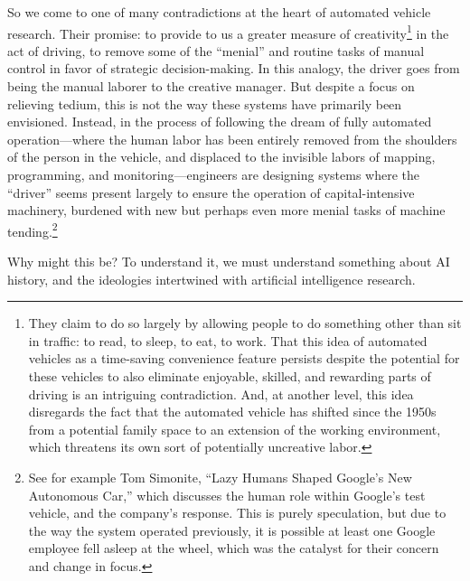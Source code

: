 So we come to one of many contradictions at the heart of
automated vehicle research. Their promise:
to provide to us a greater measure of creativity\footnote{They claim
  to do so largely by allowing people to do something other than sit
  in traffic: to read, to sleep, to eat, to work. That this idea of
  automated vehicles as a time-saving convenience feature persists
  despite the potential for these vehicles to also eliminate
  enjoyable, skilled, and rewarding parts of driving is an intriguing
  contradiction. And, at another level, this idea disregards the fact
  that the automated vehicle has shifted since the 1950s from a
  potential family space to an extension of the working environment,
  which threatens its own sort of potentially uncreative labor.} in the act of
driving, to remove some of the ``menial'' and routine tasks of manual
control in favor of strategic decision-making. In this analogy, the
driver goes from being the manual laborer to the creative manager. But
despite a focus on relieving tedium, this is not the way these systems
have primarily been envisioned. Instead, in the process of following
the dream of fully automated operation---where the human labor has been
entirely removed from the shoulders of the person in the vehicle, and
displaced to the invisible labors of mapping, programming, and
monitoring---engineers are designing systems where the ``driver''
seems present largely to ensure the operation of capital-intensive
machinery, burdened with new but perhaps even more menial tasks of
machine tending.\footnote{See for example Tom Simonite, ``Lazy Humans
Shaped Google's New Autonomous Car,''\cite{simonite}  which discusses
the human role within Google's test vehicle,
and the company's response. This is purely speculation, but due to
the way the system operated previously, it is possible at least one Google
employee fell asleep at the wheel, which was the catalyst for their
concern and change in focus.} 

Why might this be? To understand it, we must understand something
about AI history, and the ideologies intertwined with artificial
intelligence research.


